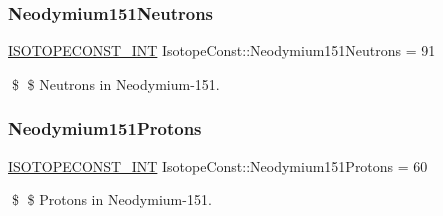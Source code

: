 \subsubsection{\texorpdfstring{Neodymium151\+Neutrons}{Neodymium151Neutrons}}
{\footnotesize\ttfamily \mbox{\hyperlink{group___isotope_const-_macros_ga5f18360b3e99483a35c32d789e62621c}{I\+S\+O\+T\+O\+P\+E\+C\+O\+N\+S\+T\+\_\+\+I\+NT}} Isotope\+Const\+::\+Neodymium151\+Neutrons = 91}

\$ \$ Neutrons in Neodymium-\/151. \mbox{\label{group___isotope_const-_neodymium-_nd151_gab06d073ba6c18b385762482f16c7c9b9}} 
\subsubsection{\texorpdfstring{Neodymium151\+Protons}{Neodymium151Protons}}
{\footnotesize\ttfamily \mbox{\hyperlink{group___isotope_const-_macros_ga5f18360b3e99483a35c32d789e62621c}{I\+S\+O\+T\+O\+P\+E\+C\+O\+N\+S\+T\+\_\+\+I\+NT}} Isotope\+Const\+::\+Neodymium151\+Protons = 60}

\$ \$ Protons in Neodymium-\/151. 